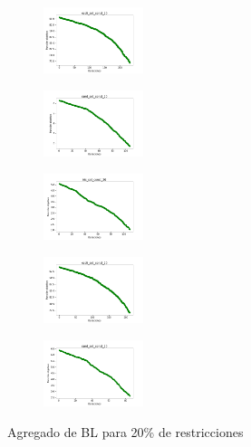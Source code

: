 \begin{figure}[H]
\begin{subfigure}
    \end{subfigure}
    \hfill
    \begin{subfigure}
        \centering
        \includegraphics[width=0.32\textwidth]{img/bl/ecoli_set_const_20_49258669_cost.png}
    \end{subfigure}
    \hfill
    \begin{subfigure}
        \centering
        \includegraphics[width=0.32\textwidth]{img/bl/rand_set_const_20_49258669_cost.png}
    \end{subfigure}
    \hfill
    \begin{subfigure}
        \centering
        \includegraphics[width=0.32\textwidth]{img/bl/iris_set_const_20_3773969821_cost.png}
    \end{subfigure}
    \hfill
    \begin{subfigure}
        \centering
        \includegraphics[width=0.32\textwidth]{img/bl/ecoli_set_const_20_3773969821_cost.png}
    \end{subfigure}
    \hfill
    \begin{subfigure}
        \centering
        \includegraphics[width=0.32\textwidth]{img/bl/rand_set_const_20_3773969821_cost.png}
    \end{subfigure}
    \caption{Agregado de BL para 20\% de restricciones}
\end{figure}

